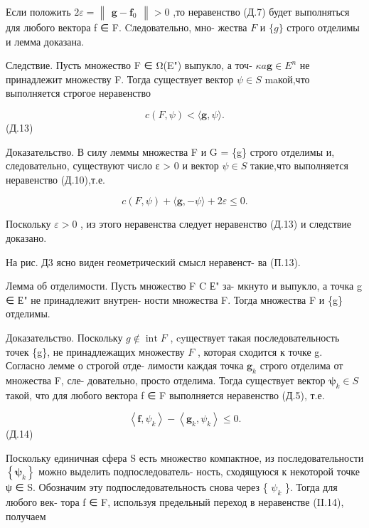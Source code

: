 \documentclass[8pt]{extarticle}
\begin{document}
Если положить \({2\varepsilon } = \left\lVert \begin{array}{c} {\mathbf{g} - {\mathbf{f}}_{0}} \end{array} \right\rVert > 0\) ,то неравенство (Д.7) будет выполняться для любого вектора f ∈ F. Cледовательно, мно- жества \(F\) и \(\{ g\}\) строго отделимы и лемма доказана.

Следствие. Пусть множество F ∈ Ω(E") выпукло, а точ- \({\kappa a}\mathbf{g} \in  {E}^{n}\) не принадлежит множеству F. Тогда существует вектор \(\psi  \in  S\) maкой,что выполняется строгое неравенство

\[
c\left( {F,\psi }\right)  < \langle \mathbf{g},\psi \rangle .
\]
 (Д.13)

Доказательство. В силу леммы множества F и G = \{g\} строго отделимы и, следовательно, существуют число ε > 0 и вектор \(\psi  \in  S\) такие,что выполняется неравенство (Д.10),т.е.

\[
c\left( {F,\psi }\right)  + \langle \mathbf{g}, - \psi \rangle  + {2\varepsilon } \leq  0.
\]

Поскольку \(\varepsilon  > 0\) , из этого неравенства следует неравенство (Д.13) и следствие доказано.

На рис. Д3 ясно виден геометрический смысл неравенст- ва (П.13).

Лемма об отделимости. Пусть множество F C Е" за- мкнуто и выпукло, а точка g ∈ Е" не принадлежит внутрен- ности множества F. Тогда множества F и \{g\} отделимы.

Доказательство. Поскольку \(g \notin  \operatorname{int}F\) , cyществует такая последовательность точек \{g\}, не принадлежащих множеству \(F\) , которая сходится к точке g. Согласно лемме о строгой отде- лимости каждая точка \({\mathbf{g}}_{k}\) строго отделима от множества F, сле- довательно, просто отделима. Тогда существует вектор \({\mathbf{\psi }}_{k} \in  S\) такой, что для любого вектора f ∈ F выполняется неравенство (Д.5), т.е.

\[
\left\langle  {\mathbf{f},{\psi }_{k}}\right\rangle   - \left\langle  {{\mathbf{g}}_{k},{\psi }_{k}}\right\rangle   \leq  0.
\]
 (Д.14)

Поскольку единичная сфера S есть множество компактное, из последовательности \(\left\{  {\mathbf{\psi }}_{k}\right\}\) можно выделить подпоследователь- ность, сходящуюся к некоторой точке ψ ∈ S. Обозначим эту подпоследовательность снова через \{ \({\psi }_{k}\) \}. Тогда для любого век- тора f ∈ F, используя предельный переход в неравенстве (II.14), получаем
\end{document}
